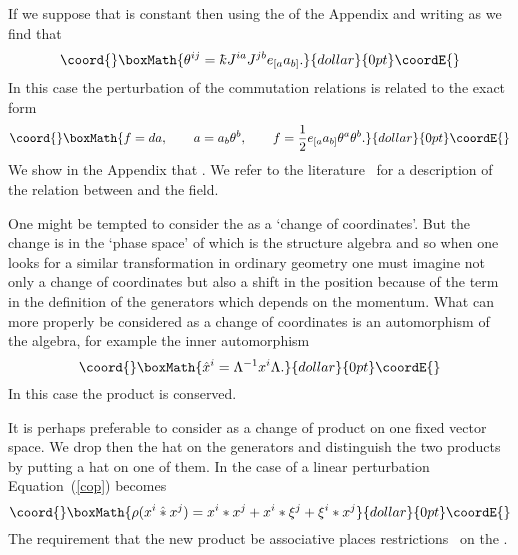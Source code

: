 \documentclass[a4paper,12pt]{article}
\def\h#1{\hat #1}
\def\t#1{\tilde #1}
\def\c#1{{\cal #1}}
\def\kbar{{\mathchar'26\mkern-9muk}}
\def\t#1{\tilde #1}
\def\wm{\mathbin{*}}
\def\hwm{\mathbin{\hat *}}
\begin{document}
If we suppose that \coordHE{} is constant then using the \myHighlight{$\h{\lambda}_a$}\coordHE{} of
the Appendix and writing \coordHE{} as \myHighlight{$\xi^i = i\kbar J^{ia} a_a$}\coordHE{} we find that
$$\coord{}\boxMath{
\theta^{ij} =  \kbar J^{ia} J^{jb} e_{[a} a_{b]}.
}{dollar}{0pt}\coordE{}$$
In this case the perturbation of the commutation relations is related to
the exact form 
$$\coord{}\boxMath{
f = da, \qquad a = a_b \theta^b, \qquad 
f = \frac 12 e_{[a} a_{b]} \theta^a \theta^b.
}{dollar}{0pt}\coordE{}$$
We show in the Appendix that \coordHE{}. We refer to the
literature~\cite{Sch99} for a description of the relation between
\coordHE{} and the \coordHE{} field.

One might be tempted to consider the \myHighlight{$F^i(\h{x}^j)$}\coordHE{} as a `change
of coordinates'. But the change is in the `phase space' of which
\myHighlight{$\t{\c}{A}$}\coordHE{} is the structure algebra and so when one looks for a
similar transformation in ordinary geometry one must imagine not only
a change of coordinates but also a shift in the position because of
the term in the definition of the generators which depends on the
momentum.  What can more properly be considered as a change of
coordinates is an automorphism of the algebra, for example the inner
automorphism
$$\coord{}\boxMath{
\h{x}^i = \Lambda^{-1} x^i \Lambda.
}{dollar}{0pt}\coordE{}$$
In this case the product is conserved. 

It is perhaps preferable to consider \myHighlight{$\rho$}\coordHE{} as a change of product on
one fixed vector space. We drop then the hat on the generators and
distinguish the two products by putting a hat on one of them.  In the
case of a linear perturbation Equation~(\ref{cop}) becomes
$$\coord{}\boxMath{
\rho(x^i \hwm x^j) = x^i \wm x^j + x^i \wm \xi^j + \xi^i \wm x^j 
}{dollar}{0pt}\coordE{}$$
The requirement that the new product be associative places
restrictions~\cite{Ger64} on the \coordHE{}.
\end{document}
